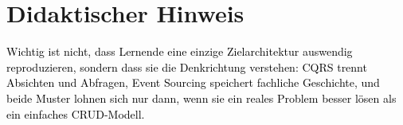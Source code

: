 \documentclass[11pt,a4paper]{article}
\newcommand{\solution}[1]{\textcolor{black}{#1}}
\begin{document}
\section*{Didaktischer Hinweis}
\solution{Wichtig ist nicht, dass Lernende eine einzige Zielarchitektur auswendig reproduzieren, sondern dass sie die Denkrichtung verstehen: CQRS trennt Absichten und Abfragen, Event Sourcing speichert fachliche Geschichte, und beide Muster lohnen sich nur dann, wenn sie ein reales Problem besser lösen als ein einfaches CRUD-Modell.}
\end{document}
